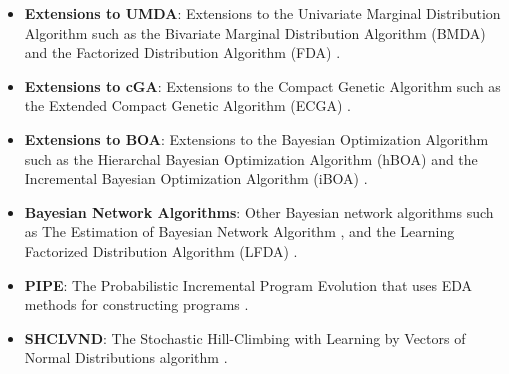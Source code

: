 \begin{bibunit}
\begin{itemize}
	\item \textbf{Extensions to UMDA}: Extensions to the Univariate Marginal Distribution Algorithm such as the Bivariate Marginal Distribution Algorithm (BMDA) \cite{Pelikan1998, Pelikan1999} and the Factorized Distribution Algorithm (FDA) \cite{Muhlenbein1999}.
	\item \textbf{Extensions to cGA}: Extensions to the Compact Genetic Algorithm such as the Extended Compact Genetic Algorithm (ECGA) \cite{Harik1999a, Harik2006}.
	\item \textbf{Extensions to BOA}: Extensions to the Bayesian Optimization Algorithm such as the Hierarchal Bayesian Optimization Algorithm (hBOA) \cite{Pelikan2000, Pelikan2001b} and the Incremental Bayesian Optimization Algorithm (iBOA) \cite{Pelikan2008}.
	\item \textbf{Bayesian Network Algorithms}: Other Bayesian network algorithms such as The Estimation of Bayesian Network Algorithm \cite{Etxeberria1999}, and the Learning Factorized Distribution Algorithm (LFDA) \cite{Muehlenbein1999}.
	\item \textbf{PIPE}: The Probabilistic Incremental Program Evolution that uses EDA methods for constructing programs \cite{Salustowicz1997}. 
	\item \textbf{SHCLVND}: The Stochastic Hill-Climbing with Learning by Vectors of Normal Distributions algorithm \cite{Rudlof1996}.
\end{itemize}

\putbib
\end{bibunit}

\newpage\begin{bibunit}\putbib\end{bibunit}
\newpage\begin{bibunit}\putbib\end{bibunit}
\newpage\begin{bibunit}\putbib\end{bibunit}
\newpage\begin{bibunit}\putbib\end{bibunit}
\newpage\begin{bibunit}\putbib\end{bibunit}
